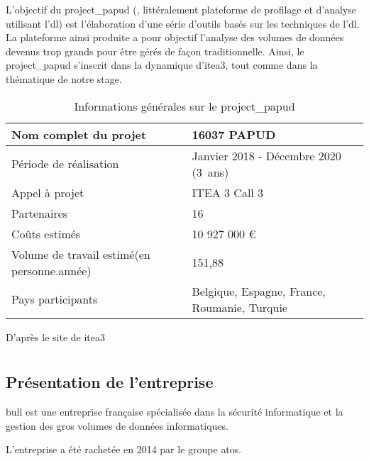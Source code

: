 L'objectif du \gls{project_papud} (, littéralement \og plateforme de profilage et d'analyse utilisant l'\gls{dl}\fg{}) est l'élaboration d'une série d'outils basés sur les techniques de l'\gls{dl}.
La plateforme ainsi produite a pour objectif l'analyse des volumes de données devenus trop grands pour être gérés de façon traditionnelle.
Ainsi, le \gls{project_papud} s'inscrit dans la dynamique d'\gls{itea3}, tout comme dans la thématique de notre stage.

\begin{table}[h]{
	\centering
	\renewcommand{\arraystretch}{1.5}
	\setlength\tabcolsep{1em}
	\begin{tabularx}{\textwidth}{|X|l|}
		\hline
		Nom complet du projet & 16037 PAPUD\\
		\hline
		Période de réalisation & Janvier 2018 - Décembre 2020 (3~ans)\\
		\hline
		Appel à projet & ITEA 3 Call 3\\
		\hline
		Partenaires & 16\\
		\hline
		Coûts estimés & 10 927 000 €\\
		\hline
		Volume de travail estimé\newline (en personne.année) & 151,88 \\
		\hline
		Pays participants & Belgique, Espagne, France, \mbox{Roumanie}, Turquie\\
		\hline
	\end{tabularx}
	\renewcommand{\arraystretch}{1}}

	{\footnotesize D'après le site de \gls{itea3} \autocite{about_papud}} \label{tab:about_papud}
	\caption[Informations générales sur le ]{Informations générales sur le \gls{project_papud}}
\end{table}

\section{}
\subsection{Présentation de l'entreprise}
\gls{bull} est une entreprise française spécialisée dans la sécurité informatique et la gestion des gros volumes de données informatiques. 

L'entreprise a été rachetée en 2014 par le groupe \gls{atos}.

